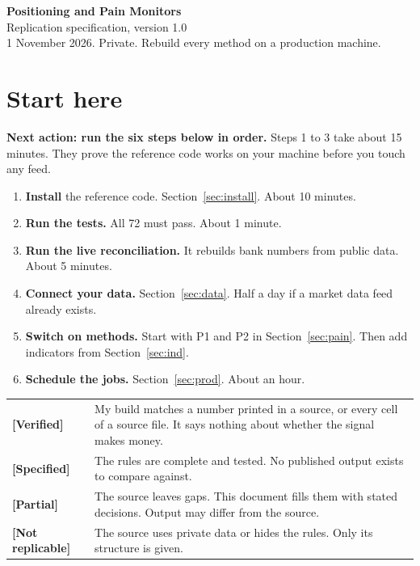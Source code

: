 \documentclass[11pt,a4paper]{article}
\newcommand{\chip}[2]{\textcolor{#1}{\sffamily\footnotesize\bfseries[#2]}}
\newcommand{\Verified}{\chip{okc}{Verified}}
\newcommand{\Specified}{\chip{specc}{Specified}}
\newcommand{\Partial}{\chip{partc}{Partial}}
\newcommand{\NotRep}{\chip{noc}{Not replicable}}
\newcommand{\sublabel}[1]{\par\vspace{3pt}\needspace{3\baselineskip}{\sffamily\small\bfseries #1}\par\nopagebreak[4]\vspace{1pt}}
\newcommand{\TestCount}{72}
\begin{document}
\begin{center}
{\sffamily\LARGE\bfseries\color{accent} Positioning and Pain Monitors}\\[3pt]
{\sffamily\large Replication specification, version 1.0}\\[2pt]
{\sffamily\small\color{muted} 1 November 2026. Private. Rebuild every method on a production machine.}
\end{center}

\section*{Start here}

\textbf{Next action: run the six steps below in order.} Steps 1 to 3 take about 15 minutes. They prove the reference code works on your machine before you touch any feed.

\begin{enumerate}
\item \textbf{Install} the reference code. Section~\ref{sec:install}. About 10 minutes.
\item \textbf{Run the tests.} All \TestCount{} must pass. About 1 minute.
\item \textbf{Run the live reconciliation.} It rebuilds bank numbers from public data. About 5 minutes.
\item \textbf{Connect your data.} Section~\ref{sec:data}. Half a day if a market data feed already exists.
\item \textbf{Switch on methods.} Start with P1 and P2 in Section~\ref{sec:pain}. Then add indicators from Section~\ref{sec:ind}.
\item \textbf{Schedule the jobs.} Section~\ref{sec:prod}. About an hour.
\end{enumerate}

\sublabel{What each status means}
\begin{tabularx}{\linewidth}{@{}lX@{}}
\Verified & My build matches a number printed in a source, or every cell of a source file. It says nothing about whether the signal makes money. \\
\Specified & The rules are complete and tested. No published output exists to compare against. \\
\Partial & The source leaves gaps. This document fills them with stated decisions. Output may differ from the source. \\
\NotRep & The source uses private data or hides the rules. Only its structure is given.
\end{tabularx}
\end{document}
